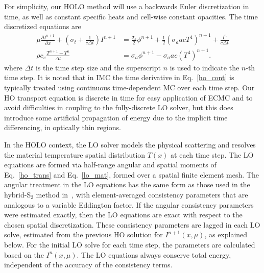 \documentclass{mc2013}
\newcommand{\pderiv}[2]{\frac{\partial #1}{\partial #2}}
\begin{document}

For simplicity, our HOLO method will use a backwards Euler discretization in time, as
well as constant specific heats and cell-wise constant opacities. The time discretized
equations are
\begin{align}
\mu \pderiv{I^{n+1}}{x} + \left(\sigma_t + \frac{1}{c \Delta t }\right) I^{n+1}
&= \frac{\sigma_s}{2} \phi^{n+1} +\frac{1}{2} \left(\sigma_a a c T^4 \right)^{n+1} + \frac{I^n}{c \Delta t} \label{ho_trans} \\
\rho c_v \frac{T^{n+1} - T^n}{\Delta t} &= \sigma_a \phi^{n+1}
- \sigma_a a c (T^4)^{n+1} \label{lo_mat}.
\end{align}
where $\Delta t$ is the time step size and the superscript $n$ is used to indicate
the $n$-th time step. It is noted that in IMC the time derivative in
Eq.~\eqref{ho_cont} is typically treated using continuous time-dependent MC over each
time step.  Our HO transport equation is
discrete in time for easy application of ECMC and to avoid difficulties in coupling to the
fully-discrete LO solver, but this does introduce some artificial propagation of
energy due to the implicit time differencing, in optically thin regions. 

In the HOLO context, the LO solver models the physical scattering and
resolves the material temperature spatial distribution $T(x)$ at each time step.  The LO equations are formed via half-range 
angular and spatial moments of
Eq.~\eqref{ho_trans} and Eq.~\eqref{lo_mat}, formed over a spatial finite element
mesh.  The angular treatment in the LO equations has the same form as those used in the
hybrid-S$_2$ method in~\cite{wolters},  with
element-averaged consistency parameters that are analogous to a variable
Eddington factor.  If the angular consistency parameters were estimated exactly, then the LO equations are exact with respect to the chosen
spatial discretization.  These consistency parameters are lagged in each LO solve,
estimated from the previous HO solution for $I^{n+1}(x,\mu)$, as explained below. For
the initial LO solve for each time step, the parameters are calculated based on the
$I^{n}(x,\mu)$.  The LO equations always conserve total energy, independent of the accuracy of the consistency terms.
\end{document}

